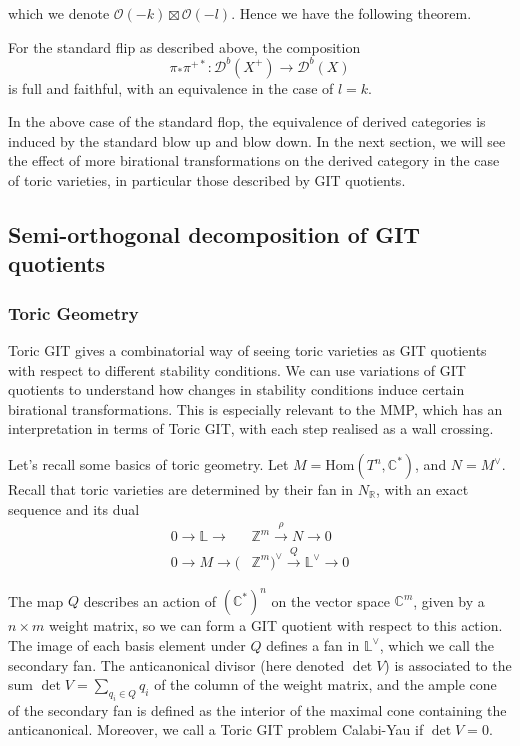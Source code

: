 which we denote $\mathcal{O}(-k) \boxtimes\mathcal{O}(-l)$. Hence we have the following theorem. 

\begin{theorem}{\cite{Huybrechts}}{}
    For the standard flip as described above, the composition $$
\pi_{*}\pi^{+*}: \mathcal{D}^{b}(X^+)\to \mathcal{D}^{b}(X)
$$ is full and faithful, with an equivalence in the case of $l =k$. 
\end{theorem}

In the above case of the standard flop, the equivalence of derived categories is induced by the standard blow up and blow down. In the next section, we will see the effect of more birational transformations on the derived category in the case of toric varieties, in particular those described by GIT quotients. 

\subsection{Semi-orthogonal decomposition of GIT quotients}

\subsubsection{Toric Geometry}

Toric GIT gives a combinatorial way of seeing toric varieties as GIT quotients with respect to different stability conditions. We can use variations of GIT quotients to understand how changes in stability conditions induce certain birational transformations. This is especially relevant to the MMP, which has an interpretation in terms of Toric GIT, with each step realised as a wall crossing.

Let's recall some basics of toric geometry. Let $M = \mathrm{Hom}(T^{n}, \mathbb{C}^*)$, and $N = M^{\vee}$. Recall that toric varieties are determined by their fan in $N_\mathbb{R}$, with an exact sequence and its dual
\begin{align*}
0 \to \mathbb{L}\to &\mathbb{Z}^{m}\xrightarrow{\rho}N \to 0 \\
0 \to M \to (&\mathbb{Z}^{m})^{\vee} \xrightarrow{Q} \mathbb{L}^{\vee}\to {0}
\end{align*}

The map $Q$ describes an action of $(\mathbb{C}^{*})^n$ on the vector space $\mathbb{C}^m$, given by a $n\times m$ weight matrix, so we can form a GIT quotient with respect to this action. The image of each basis element under $Q$ defines a fan in $\mathbb{L}^{\vee}$, which we call the secondary fan. The anticanonical divisor (here denoted $\det V$) is associated to the sum $\det V = \sum_{q_{i}\in Q}q_i$ of the column of the weight matrix, and the ample cone of the secondary fan is defined as the interior of the maximal cone containing the anticanonical. Moreover, we call a Toric GIT problem Calabi-Yau if $\det V = 0$.  

